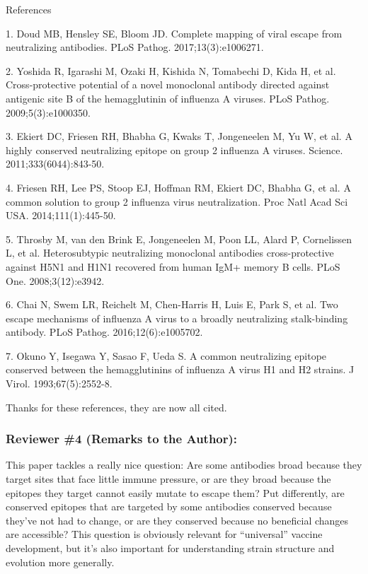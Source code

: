 \documentclass[11pt, oneside]{article}   	%
\begin{document}
References

1.  Doud MB, Hensley SE, Bloom JD. Complete mapping of viral escape from neutralizing antibodies. PLoS Pathog. 2017;13(3):e1006271.

2.  Yoshida R, Igarashi M, Ozaki H, Kishida N, Tomabechi D, Kida H, et al. Cross-protective potential of a novel monoclonal antibody directed against antigenic site B of the hemagglutinin of influenza A viruses. PLoS Pathog. 2009;5(3):e1000350.

3.  Ekiert DC, Friesen RH, Bhabha G, Kwaks T, Jongeneelen M, Yu W, et al. A highly conserved neutralizing epitope on group 2 influenza A viruses. Science. 2011;333(6044):843-50.

4.  Friesen RH, Lee PS, Stoop EJ, Hoffman RM, Ekiert DC, Bhabha G, et al. A common solution to group 2 influenza virus neutralization. Proc Natl Acad Sci USA. 2014;111(1):445-50.

5.  Throsby M, van den Brink E, Jongeneelen M, Poon LL, Alard P, Cornelissen L, et al. Heterosubtypic neutralizing monoclonal antibodies cross-protective against H5N1 and H1N1 recovered from human IgM+ memory B cells. PLoS One. 2008;3(12):e3942.

6.  Chai N, Swem LR, Reichelt M, Chen-Harris H, Luis E, Park S, et al. Two escape mechanisms of influenza A virus to a broadly neutralizing stalk-binding antibody. PLoS Pathog. 2016;12(6):e1005702.

7.  Okuno Y, Isegawa Y, Sasao F, Ueda S. A common neutralizing epitope conserved between the hemagglutinins of influenza A virus H1 and H2 strains. J Virol. 1993;67(5):2552-8.

{\color{black}
Thanks for these references, they are now all cited.
}


\subsubsection*{Reviewer \#4 (Remarks to the Author):}

This paper tackles a really nice question: Are some antibodies broad because they target sites that face little immune pressure, or are they broad because the epitopes they target cannot easily mutate to escape them? Put differently, are conserved epitopes that are targeted by some antibodies conserved because they've not had to change, or are they conserved because no beneficial changes are accessible? This question is obviously relevant for ``universal'' vaccine development, but it's also important for understanding strain structure and evolution more generally.
\end{document}
